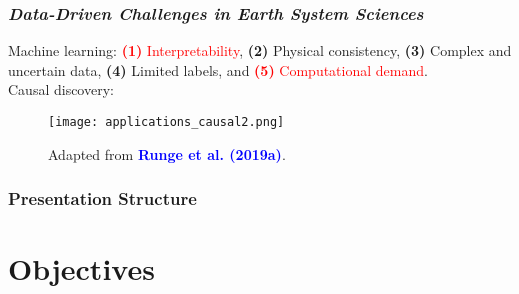 \documentclass[11pt]{beamer}
\newcommand{\citat}[2]{\textbf{\textcolor{blue}{#1 et al. (#2)}}}
\begin{document}
\begin{frame}[fragile]
  \frametitle{\normalsize{\textbf{
        \emph{Data-Driven Challenges in Earth System Sciences}
  }}} 

  \scriptsize{

    \vspace{0.25cm}
    
    \textbullet \: Machine learning: \textcolor{red}{\textbf{(1)}
    Interpretability}, \textbf{(2)} Physical consistency, \textbf{(3)} Complex
    and uncertain data, \textbf{(4)} Limited labels, and
    \textcolor{red}{\textbf{(5)} Computational demand}. \\[0.10cm] 
    
    \textbullet \: Causal discovery:
    
    \begin{figure}[h!]
      \centering
      \texttt{[image: applications\_causal2.png]}
      \caption*{\scriptsize{
          Adapted from \citat{Runge}{2019a}.
      }}
    \end{figure}
    
  }
  
\end{frame}

\begin{frame}
  \frametitle{\normalsize{\textbf{
        Presentation Structure
  }}}

  \section{Objectives}
  \tableofcontents[currentsection] 
  
\end{frame}
\end{document}
